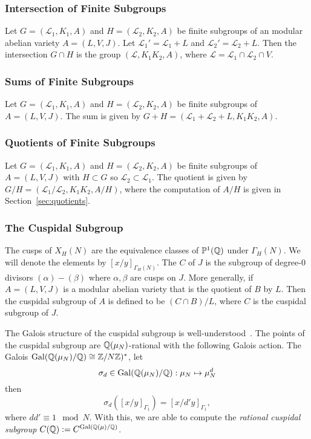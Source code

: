 \documentclass{article}
\begin{document}
\subsubsection{Intersection of Finite Subgroups}

Let $G=(\mathcal{L}_1, K_1, A)$ and $H=(\mathcal{L}_2, K_2, A)$ be finite
subgroups of an modular abelian variety $A=(L, V, J)$. Let $\mathcal{L}_1 ' =
	\mathcal{L}_1+L$ and $\mathcal{L}_2 ' = \mathcal{L}_2 + L$. Then the
intersection $G\cap H$ is the group $(\mathcal{L}, K_1K_2, A)$, where
$\mathcal{L}=\mathcal{L}_1\cap \mathcal{L}_2 \cap V$.

\subsubsection{Sums of Finite Subgroups}

Let $G=(\mathcal{L}_1, K_1, A)$ and $H=(\mathcal{L}_2, K_2, A)$ be finite
subgroups of $A=(L, V, J)$. The sum is given by $G+H=(\mathcal{L}_1 +
	\mathcal{L}_2+L, K_1K_2, A)$.

\subsubsection{Quotients of Finite Subgroups}

Let $G=(\mathcal{L}_1, K_1, A)$ and $H=(\mathcal{L}_2, K_2, A)$ be finite
subgroups of $A=(L, V, J)$ with $H\subset G$ so $\mathcal{L}_2\subset
	\mathcal{L}_1$. The quotient is given by $G/H=(\mathcal{L}_1/\mathcal{L}_2,
	K_1K_2, A/H)$, where the computation of $A/H$ is given in
Section~\ref{sec:quotients}.


\subsubsection{The Cuspidal Subgroup}

The cusps of $X_H(N)$ are the equivalence classes of $\mathbb{P}^1(\mathbb{Q})$ under
$\Gamma_H(N)$. We will denote the elements by $[x/y]_{\Gamma_H(N)}$. The
 $C$ of $J$ is the subgroup of degree-0 divisors
$(\alpha)-(\beta)$ where $\alpha, \beta$ are cusps on $J$. More generally, if
$A=(L, V, J)$ is a modular abelian variety that is the quotient of $B$ by $L$.
Then the cuspidal subgroup of $A$ is defined to be $(C\cap B)/L$, where $C$ is
the cuspidal subgroup of $J$.

The Galois structure of the cuspidal subgroup is well-understood~\cite[\S
	1.3]{MR670070}. The points of the cuspidal subgroup are $\mathbb{Q}(\mu_N)$-rational
with the following Galois action. The Galois $\operatorname{Gal}(\mathbb{Q}(\mu_N)/\mathbb{Q})\cong
	\mathbb{Z}/N\mathbb{Z})^*$, let
\[
	\sigma_d\in \operatorname{Gal}(\mathbb{Q}(\mu_N)/\mathbb{Q}):\mu_N\mapsto \mu_N ^d
\]
then
\[
	\sigma_d([x/y]_{\Gamma_1})=[x/d'y]_{\Gamma_1},
\]
where $dd'\equiv 1 \mod{N}$. With this, we are able to compute the
\emph{rational cuspidal subgroup} $C(\mathbb{Q}):=C^{\operatorname{Gal}(\mathbb{Q}(\mu)/\mathbb{Q})}$.
\end{document}
